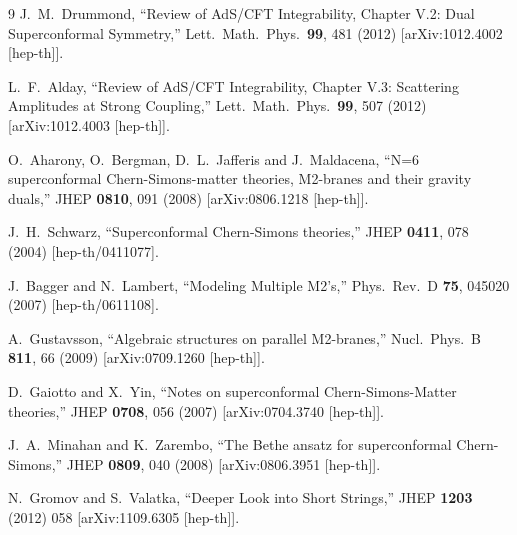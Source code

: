 \documentclass[a4paper,11pt]{article}
\numberwithin{equation}{section}
\begin{document}
\begin{thebibliography} {9}
  J.~M.~Drummond,
  ``Review of AdS/CFT Integrability, Chapter V.2: Dual Superconformal Symmetry,''
  Lett.\ Math.\ Phys.\  {\bf 99}, 481 (2012)
  [arXiv:1012.4002 [hep-th]].

  L.~F.~Alday,
  ``Review of AdS/CFT Integrability, Chapter V.3: Scattering Amplitudes at Strong Coupling,''
  Lett.\ Math.\ Phys.\  {\bf 99}, 507 (2012)
  [arXiv:1012.4003 [hep-th]].

  O.~Aharony, O.~Bergman, D.~L.~Jafferis and J.~Maldacena,
  ``N=6 superconformal Chern-Simons-matter theories, M2-branes and their gravity duals,''
  JHEP {\bf 0810}, 091 (2008)
  [arXiv:0806.1218 [hep-th]].

  J.~H.~Schwarz,
  ``Superconformal Chern-Simons theories,''
  JHEP {\bf 0411}, 078 (2004)
  [hep-th/0411077].

  J.~Bagger and N.~Lambert,
  ``Modeling Multiple M2's,''
  Phys.\ Rev.\ D {\bf 75}, 045020 (2007)
  [hep-th/0611108].

  A.~Gustavsson,
  ``Algebraic structures on parallel M2-branes,''
  Nucl.\ Phys.\ B {\bf 811}, 66 (2009)
  [arXiv:0709.1260 [hep-th]].

  D.~Gaiotto and X.~Yin,
  ``Notes on superconformal Chern-Simons-Matter theories,''
  JHEP {\bf 0708}, 056 (2007)
  [arXiv:0704.3740 [hep-th]].

  J.~A.~Minahan and K.~Zarembo,
  ``The Bethe ansatz for superconformal Chern-Simons,''
  JHEP {\bf 0809}, 040 (2008)
  [arXiv:0806.3951 [hep-th]].

  N.~Gromov and S.~Valatka,
  ``Deeper Look into Short Strings,''
  JHEP {\bf 1203} (2012) 058
  [arXiv:1109.6305 [hep-th]].


\end{thebibliography}
\end{document}
